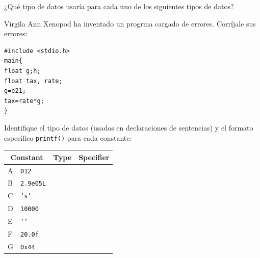 \documentclass[spanish,addpoints,answers,a4paper]{exam}
\begin{document}
\begin{questions}

\question ¿Qué tipo de datos usaría para cada uno de los siguientes tipos de datos?

\begin{solution}

\end{solution}

\question Virgila Ann Xenopod ha inventado un progrma cargado de errores. Corríjale sus errores:

\begin{verbatim}
#include <stdio.h>
main{
float g;h;
float tax, rate;
g=e21;
tax=rate*g;
}
\end{verbatim}

\begin{solution}

\end{solution}

\question Identifique el tipo de datos (usados en declaraciones de sentencias) y el formato específico \texttt{printf()} para cada constante:

\begin{table}[H]
	\centering
\begin{tabular}{|l|l|c|c|}
	\hline
	\multicolumn{2}{|c|}{\bfseries Constant} & \textbf{Type} & \textbf{Specifier}	\\
	\hline
	A	&	\texttt{012} 	& 	& 	\\
	\hline
	B 	&	\texttt{2.9e05L}&	&	\\
	\hline
	C	&	\texttt{'s'}	& 	&	\\
	\hline
	D	&	\texttt{10000} 	& 	&	\\
	\hline
	E	&	\texttt{'\n'} 	&	&	\\
	\hline
	F	&	\texttt{20.0f}	&	&	\\
	\hline
	G	&	\texttt{0x44}	&	&	\\
	\hline
\end{tabular}
\end{table}


\end{questions}
\end{document}

